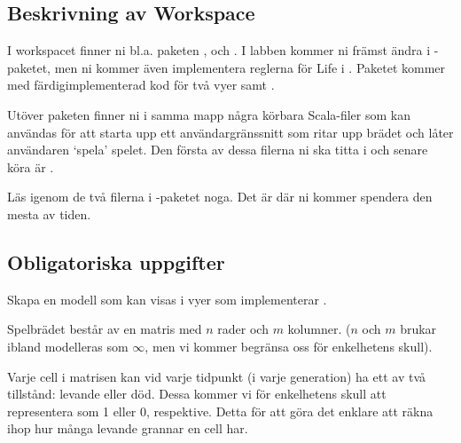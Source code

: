 \subsection{Beskrivning av Workspace}

I workspacet finner ni bl.a. paketen ,  och . I labben kommer ni främst ändra i -paketet, men ni kommer även implementera reglerna för Life i . Paketet  kommer med färdigimplementerad kod för två vyer  samt .

Utöver paketen finner ni i samma mapp några körbara Scala-filer som kan användas för att starta upp ett användargränssnitt som ritar upp brädet och låter användaren `spela' spelet. Den första av dessa filerna ni ska titta i och senare köra är .

Läs igenom de två filerna i -paketet noga. Det är där ni kommer spendera den mesta av tiden.


\subsection{Obligatoriska uppgifter}


\Task Skapa en modell som kan visas i vyer som implementerar .

Spelbrädet består av en matris med $n$ rader och $m$ kolumner. ($n$ och $m$ brukar ibland modelleras som $\infty$, men vi kommer begränsa oss för enkelhetens skull).

Varje cell i matrisen kan vid varje tidpunkt (i varje generation) ha ett av två tillstånd: levande eller död. Dessa kommer vi för enkelhetens skull att representera som 1 eller 0, respektive. Detta för att göra det enklare att räkna ihop hur många levande grannar en cell har.

